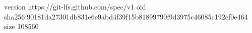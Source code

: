 version https://git-lfs.github.com/spec/v1
oid sha256:90181da27301db831e6e9abd4f39f15b81899790f9d3975c46085c192cf0e464
size 108560
